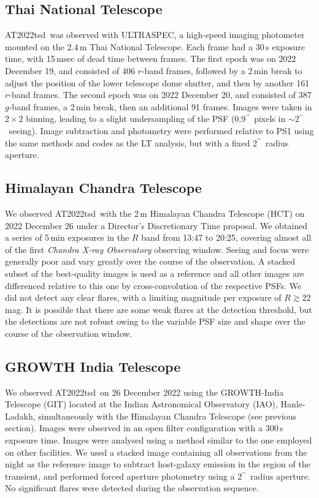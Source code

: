 \documentclass{nature_plusfigure}
\newcommand{\at}{AT2022tsd}
\newcommand{\arcsec}{$^{\prime\prime}$}
\begin{document}
\begin{methods}
\subsection{Thai National Telescope}
\label{sec:ultraspec}

\at\ was observed with ULTRASPEC\cite{Dhillon2014}, a high-speed imaging photometer mounted on the 2.4\,m Thai National Telescope. Each frame had a 30\,s exposure time, with 15\,msec of dead time between frames. The first epoch was on 2022 December 19, and consisted of 406 $r$-band frames, followed by a 2\,min break to adjust the position of the lower telescope dome shutter, and then by another 161 $r$-band frames. The second epoch was on 2022 December 20, and consisted of 387 $g$-band frames, a 2\,min break, then an additional 91 frames.  Images were taken in $2\times2$ binning, leading to a slight undersampling of the PSF (0.9\arcsec\ pixels in $\sim 2$\arcsec\ seeing).  Image subtraction and photometry were performed relative to PS1 using the same methods and codes as the LT analysis, but with a fixed 2\arcsec\ radius aperture.

\subsection{Himalayan Chandra Telescope}
\label{sec:HCT}

We observed \at\ with the 2\,m Himalayan Chandra Telescope (HCT) on 2022 December 26 under a Director's Discretionary Time proposal. We obtained a series of 5\,min exposures in the $R$ band from 13:47 to 20:25, covering almost all of the first {\it Chandra X-ray Observatory} observing window.  Seeing and focus were generally poor and vary greatly over the course of the observation.  A stacked subset of the best-quality images is used as a reference and all other images are differenced relative to this one by cross-convolution of the respective PSFs.   We did not detect any clear flares, with a limiting magnitude per exposure of $R\gtrsim22\,$mag. It is possible that there are some weak flares at the detection threshold, but the detections are not robust owing to the variable PSF size and shape over the course of the observation window.

\subsection{GROWTH India Telescope}
\label{sec:GIT}

We observed \at\ on 26 December 2022 using the GROWTH-India Telescope (GIT\cite{Kumar2022}) located at the Indian Astronomical Observatory (IAO), Hanle-Ladakh, simultaneously with the Himalayan Chandra Telescope (see previous section). Images were observed in an open filter configuration with a 300\,s exposure time. Images were analysed using a method similar to the one employed on other facilities.  We used a stacked image containing all observations from the night as the reference image to subtract host-galaxy emission in the region of the transient, and performed forced aperture photometry using a 2\arcsec\ radius aperture.  No significant flares were detected during the observation sequence.


\end{methods}
\end{document}
